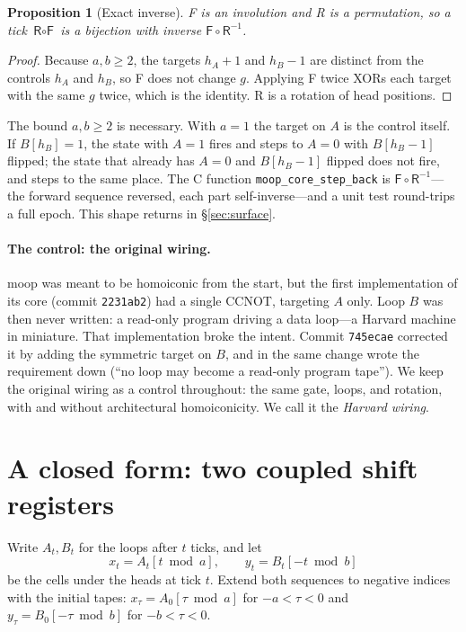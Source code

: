 \documentclass[11pt]{article}
\newtheorem{proposition}[theorem]{Proposition}
\theoremstyle{definition}
\theoremstyle{remark}
\newcommand{\moop}{\textsf{moop}}
\newcommand{\code}[1]{\texttt{#1}}
\begin{document}
\begin{proposition}[Exact inverse]
\label{prop:inverse}
\textsf{F} is an involution and \textsf{R} is a permutation, so a tick
$\textsf{R}\circ\textsf{F}$ is a bijection with inverse
$\textsf{F}\circ\textsf{R}^{-1}$.
\end{proposition}
\begin{proof}
Because $a,b\ge2$, the targets $h_A+1$ and $h_B-1$ are distinct from the
controls $h_A$ and $h_B$, so \textsf{F} does not change $g$. Applying
\textsf{F} twice XORs each target with the same $g$ twice, which is the
identity. \textsf{R} is a rotation of head positions.
\end{proof}

The bound $a,b\ge2$ is necessary. With $a=1$ the target on $A$ is the
control itself. If $B[h_B]=1$, the state with $A=1$ fires and steps to
$A=0$ with $B[h_B-1]$ flipped; the state that already has $A=0$ and
$B[h_B-1]$ flipped does not fire, and steps to the same place. The C function \code{moop\_core\_step\_back} is
$\textsf{F}\circ\textsf{R}^{-1}$---the forward sequence reversed, each
part self-inverse---and a unit test round-trips a full epoch. This shape
returns in \S\ref{sec:surface}.

\paragraph{The control: the original wiring.}
\moop{} was meant to be homoiconic from the start, but the first
implementation of its core (commit \code{2231ab2}) had a single CCNOT,
targeting $A$ only. Loop $B$ was then never written: a read-only program
driving a data loop---a Harvard machine in miniature. That implementation
broke the intent. Commit \code{745ecae} corrected it by adding the
symmetric target on $B$, and in the same change wrote the requirement
down (``no loop may become a read-only program tape''). We keep the
original wiring as a control throughout: the same gate, loops, and
rotation, with and without architectural homoiconicity. We call it the
\emph{Harvard wiring}.

\section{A closed form: two coupled shift registers}
\label{sec:closed}

Write $A_t,B_t$ for the loops after $t$ ticks, and let
\[
x_t = A_t[t \bmod a],\qquad y_t = B_t[-t \bmod b]
\]
be the cells under the heads at tick $t$. Extend both sequences to
negative indices with the initial tapes: $x_\tau=A_0[\tau\bmod a]$ for
$-a<\tau<0$ and $y_\tau=B_0[-\tau\bmod b]$ for $-b<\tau<0$.
\end{document}
